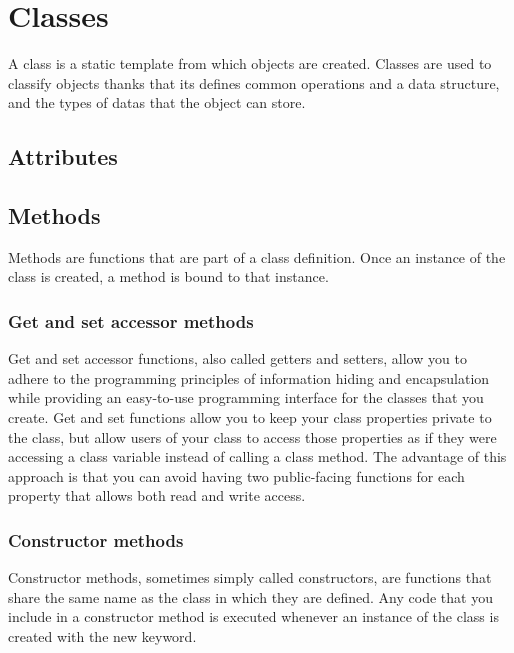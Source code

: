 \section{Classes}

A class is a static 
template from which objects are 
created. Classes are used 
to classify objects thanks 
that its defines 
common operations 
and a data structure, 
and the types of 
datas that the object can 
store.


\subsection{Attributes}

\subsection{Methods}
Methods are functions that are part of a class 
definition. Once an instance of the class is created, 
a method is bound to that instance.

	\subsubsection{Get and set accessor methods}
	Get and set accessor functions, also called getters 
	and setters, allow you to adhere to the programming principles of 
	information hiding and encapsulation while providing an 
	easy-to-use programming interface for the classes that you 
	create. Get and set functions allow you to keep your class 
	properties private to the class, but allow users of your class 
	to access those properties as if they were accessing a 
	class variable instead of calling a class method. 
	The advantage of this approach is that you can avoid 
	having two public-facing functions for each property 
	that allows both read and write access.
	
	\subsubsection{Constructor methods}
	Constructor methods, sometimes simply called constructors, 
	are functions that share the same name as the class in 
	which they are defined. Any code that you include in 
	a constructor method is executed whenever an instance of the 
	class is created with the  new  keyword.
